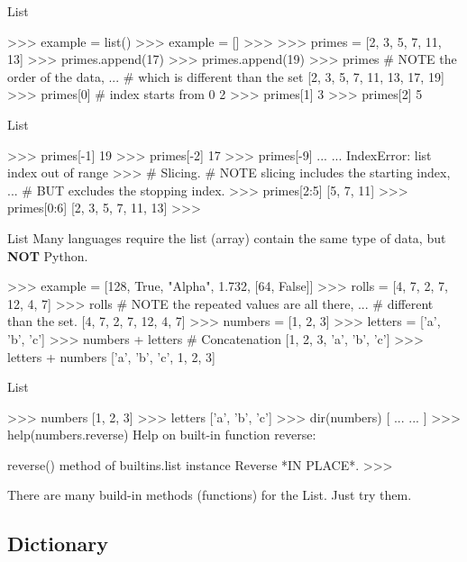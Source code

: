 \documentclass{beamer}
\begin{document}
\begin{frame}[fragile]{List}
\begin{pythoncode}
>>> example = list()
>>> example = []
>>> 
>>> primes = [2, 3, 5, 7, 11, 13]
>>> primes.append(17)
>>> primes.append(19)
>>> primes  # NOTE the order of the data, 
...         # which is different than the set
[2, 3, 5, 7, 11, 13, 17, 19]
>>> primes[0]  # index starts from 0
2
>>> primes[1]
3
>>> primes[2]
5
\end{pythoncode}
\end{frame}

\begin{frame}[fragile]{List}
\begin{pythoncode}
>>> primes[-1]
19
>>> primes[-2]
17
>>> primes[-9]
... ...
IndexError: list index out of range
>>> # Slicing. # NOTE slicing includes the starting index,
...            #     BUT excludes the stopping index.
>>> primes[2:5]
[5, 7, 11]
>>> primes[0:6]
[2, 3, 5, 7, 11, 13]
>>>
\end{pythoncode}
\end{frame}

\begin{frame}[fragile]{List}
Many languages require the list (array) contain the same type of data, 
but \textbf{NOT} Python.\\
\begin{pythoncode}
>>> example = [128, True, "Alpha", 1.732, [64, False]]
>>> rolls = [4, 7, 2, 7, 12, 4, 7]
>>> rolls  # NOTE the repeated values are all there, 
...        # different than the set.
[4, 7, 2, 7, 12, 4, 7]
>>> numbers = [1, 2, 3]
>>> letters = ['a', 'b', 'c']
>>> numbers + letters  # Concatenation
[1, 2, 3, 'a', 'b', 'c']
>>> letters + numbers
['a', 'b', 'c', 1, 2, 3]
\end{pythoncode}
\end{frame}

\begin{frame}[fragile]{List}
\begin{pythoncode}
>>> numbers
[1, 2, 3]
>>> letters
['a', 'b', 'c']
>>> dir(numbers)
[ ... ... ]
>>> help(numbers.reverse)
Help on built-in function reverse:

reverse() method of builtins.list instance
    Reverse *IN PLACE*.
>>> 
\end{pythoncode}
There are many build-in methods (functions) for the List. Just try them.
\end{frame}

\subsection{Dictionary}
\end{document}
